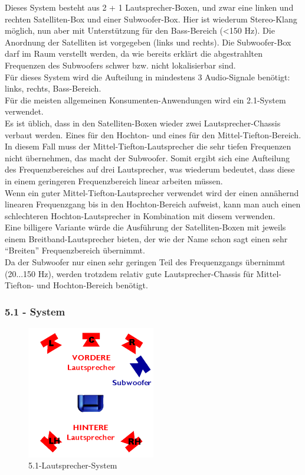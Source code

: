 Dieses System besteht aus 2 + 1 Lautsprecher-Boxen, und zwar eine linken und rechten Satelliten-Box und einer Subwoofer-Box.
Hier ist wiederum Stereo-Klang möglich, nun aber mit Unterstützung für den Bass-Bereich (<150 Hz).
Die Anordnung der Satelliten ist vorgegeben (links und rechts).
Die Subwoofer-Box darf im Raum verstellt werden, da wie bereits erklärt die abgestrahlten Frequenzen des Subwoofers schwer bzw. nicht lokalisierbar sind.\\
Für dieses System wird die Aufteilung in mindestens 3 Audio-Signale benötigt:
links, rechts, Bass-Bereich.\\
Für die meisten allgemeinen Konsumenten-Anwendungen wird ein 2.1-System verwendet.\\ 
Es ist üblich, dass in den Satelliten-Boxen wieder zwei Lautsprecher-Chassis verbaut werden.
Eines für den Hochton- und eines für den Mittel-Tiefton-Bereich.
In diesem Fall muss der Mittel-Tiefton-Lautsprecher die sehr tiefen Frequenzen nicht übernehmen, das macht der Subwoofer.
Somit ergibt sich eine Aufteilung des Frequenzbereiches auf drei Lautsprecher, was wiederum bedeutet, dass diese in einem geringeren Frequenzbereich linear arbeiten müssen.\\
Wenn ein guter Mittel-Tiefton-Lautsprecher verwendet wird der einen annähernd linearen Frequenzgang bis in den Hochton-Bereich aufweist, kann man auch einen schlechteren Hochton-Lautsprecher in Kombination mit diesem verwenden.\\
Eine billigere Variante würde die Ausführung der Satelliten-Boxen mit jeweils einem Breitband-Lautsprecher bieten, der wie der Name schon sagt einen sehr \enquote{Breiten} Frequenzbereich übernimmt.\\
Da der Subwoofer nur einen sehr geringen Teil des Frequenzgangs übernimmt (20...150 Hz), werden trotzdem relativ gute Lautsprecher-Chassis für Mittel-Tiefton- und Hochton-Bereich benötigt.



\subsubsection*{5.1 - System}
\begin{figure} [H]
	\centering
	\includegraphics[width=0.5\textwidth]{img/Grundlagen/Mehrweg-Lautsprechersysteme/DOLBYDigital51-cut.jpg}
	\caption{5.1-Lautsprecher-System}
	\label{fig:3.2.6}
\end{figure}

